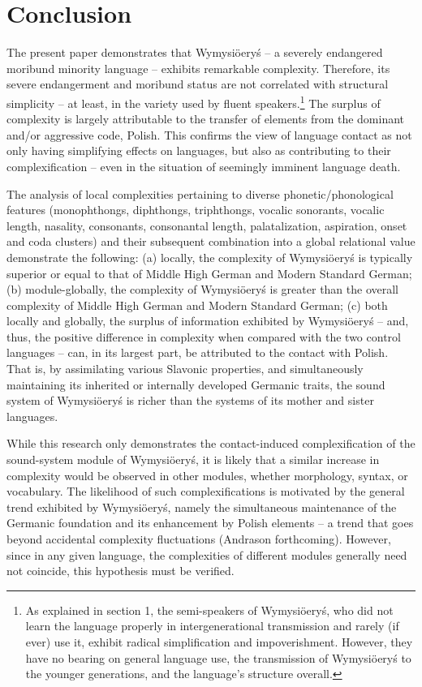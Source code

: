 \documentclass[output=paper]{langscibook}
\begin{document}
\section{Conclusion}\label{sec:wymsorys:5}

The present paper demonstrates that Wymysiöeryś – a severely endangered moribund minority language – exhibits remarkable complexity. Therefore, its severe endangerment and moribund status are not correlated with structural simplicity – at least, in the variety used by fluent speakers.\footnote{As explained in section 1, the semi-speakers of Wymysiöeryś, who did not learn the language properly in intergenerational transmission and rarely (if ever) use it, exhibit radical simplification and impoverishment. However, they have no bearing on general language use, the transmission of Wymysiöeryś to the younger generations, and the language’s structure overall.} The surplus of complexity is largely attributable to the transfer of elements from the dominant and/or aggressive code, Polish. This confirms the view of language contact as not only having simplifying effects on languages, but also as contributing to their complexification – even in the situation of seemingly imminent language death.

The analysis of local complexities pertaining to diverse phonetic/phonological features (monophthongs, diphthongs, triphthongs, vocalic sonorants, vocalic length, nasality, consonants, consonantal length, palatalization, aspiration, onset and coda clusters) and their subsequent combination into a global relational value demonstrate the following: (a) locally, the complexity of Wymysiöeryś is typically superior or equal to that of Middle High German and Modern Standard German; (b) module-globally, the complexity of Wymysiöeryś is greater than the overall complexity of Middle High German and Modern Standard German; (c) both locally and globally, the surplus of information exhibited by Wymysiöeryś – and, thus, the positive difference in complexity when compared with the two control languages – can, in its largest part, be attributed to the contact with Polish. That is, by assimilating various Slavonic properties, and simultaneously maintaining its inherited or internally developed Germanic traits, the sound system of Wymysiöeryś is richer than the systems of its mother and sister languages. 

While this research only demonstrates the contact-induced complexification of the sound-system module of Wymysiöeryś, it is likely that a similar increase in complexity would be observed in other modules, whether morphology, syntax, or vocabulary. The likelihood of such complexifications is motivated by the general trend exhibited by Wymysiöeryś, namely the simultaneous maintenance of the Germanic foundation and its enhancement by Polish elements – a trend that goes beyond accidental complexity fluctuations (Andrason forthcoming). However, since in any given language, the complexities of different modules generally need not coincide, this hypothesis must be verified.

\sloppy\printbibliography[heading=subbibliography,notkeyword=this]
\end{document}
